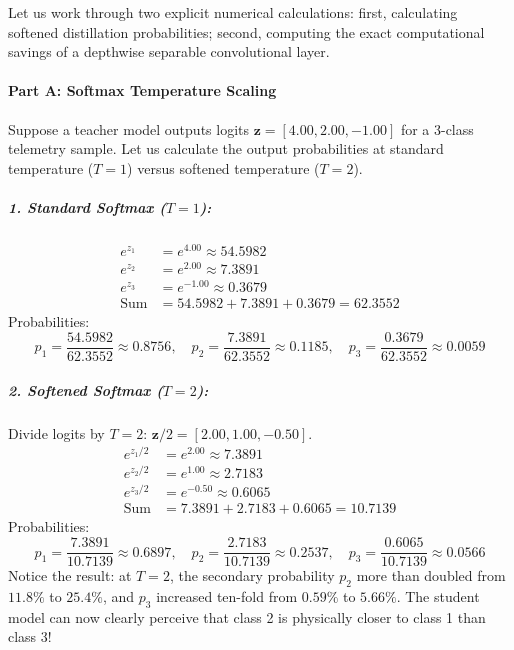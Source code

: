 \begin{example}
Let us work through two explicit numerical calculations: first, calculating softened distillation probabilities; second, computing the exact computational savings of a depthwise separable convolutional layer.

\paragraph{Part A: Softmax Temperature Scaling}
Suppose a teacher model outputs logits $\mathbf{z} = [4.00, 2.00, -1.00]$ for a 3-class telemetry sample.
Let us calculate the output probabilities at standard temperature ($T = 1$) versus softened temperature ($T = 2$).

\subparagraph{1. Standard Softmax ($T = 1$):}
\begin{align*}
e^{z_1} &= e^{4.00} \approx 54.5982\\
e^{z_2} &= e^{2.00} \approx 7.3891\\
e^{z_3} &= e^{-1.00} \approx 0.3679\\
\text{Sum} &= 54.5982 + 7.3891 + 0.3679 = 62.3552
\end{align*}
Probabilities:
\begin{equation*}
p_1 = \frac{54.5982}{62.3552} \approx \mathbf{0.8756}, \quad p_2 = \frac{7.3891}{62.3552} \approx \mathbf{0.1185}, \quad p_3 = \frac{0.3679}{62.3552} \approx \mathbf{0.0059}
\end{equation*}

\subparagraph{2. Softened Softmax ($T = 2$):}
Divide logits by $T = 2$: $\mathbf{z}/2 = [2.00, 1.00, -0.50]$.
\begin{align*}
e^{z_1/2} &= e^{2.00} \approx 7.3891\\
e^{z_2/2} &= e^{1.00} \approx 2.7183\\
e^{z_3/2} &= e^{-0.50} \approx 0.6065\\
\text{Sum} &= 7.3891 + 2.7183 + 0.6065 = 10.7139
\end{align*}
Probabilities:
\begin{equation*}
p_1 = \frac{7.3891}{10.7139} \approx \mathbf{0.6897}, \quad p_2 = \frac{2.7183}{10.7139} \approx \mathbf{0.2537}, \quad p_3 = \frac{0.6065}{10.7139} \approx \mathbf{0.0566}
\end{equation*}
Notice the result: at $T=2$, the secondary probability $p_2$ more than doubled from $11.8\%$ to $25.4\%$, and $p_3$ increased ten-fold from $0.59\%$ to $5.66\%$. The student model can now clearly perceive that class 2 is physically closer to class 1 than class 3!


\end{example}
